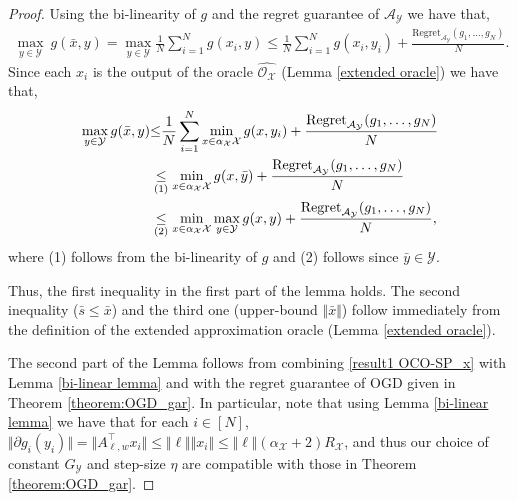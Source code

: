 \documentclass[a4paper,12pt]{article}
\newcommand{\mY}{\mathcal{Y}}
\newcommand{\mX}{\mathcal{X}}
\newcommand{\oraclex}{\mathcal{O}_{\mX}}
\begin{document}
\begin{proof}
Using the bi-linearity of $g$ and the regret guarantee of $\mathcal{A}_\mY$ we have that,
\begin{align*}
\max_{y \in \mY}\ g(\bar{x},y) = \max_{y \in \mY}\frac{1}{N}\sum_{i=1}^N g(x_i,y) \leq \frac{1}{N}\sum_{i=1}^N g(x_i,y_i) +\frac{\text{Regret}_{\mathcal{A}_\mY}(g_1,\dots,g_N)}{N}.
\end{align*}
Since each $x_i$ is the output of the oracle $\widehat{\oraclex}$ (Lemma \ref{extended oracle}) we have that,
\begin{align} \label{result1 OCO-SP_x}
\max_{y \in \mY} g(\bar{x},y) &{\leq} \frac{1}{N}\sum_{i=1}^N\min_{x\in \alpha_{\mX} \mX} g(x,y_i)+\frac{\text{Regret}_{\mathcal{A}_\mY}(g_1,\dots,g_N)}{N} \notag \\
&\underset{(1)}{\leq}  \min_{x\in \alpha_{\mX} \mX} g(x,\bar{y})+\frac{\text{Regret}_{\mathcal{A}_\mY}(g_1,\dots,g_N)}{N} \notag \\
&\underset{(2)}{\leq}  \min_{x\in \alpha_{\mX} \mX} \max_{y\in \mY} g(x,y)+\frac{\text{Regret}_{\mathcal{A}_\mY}(g_1,\dots,g_N)}{N} ,
\end{align}
where (1) follows from the bi-linearity of $g$ and (2) follows since $\bar{y}\in\mY$.

Thus, the first inequality in the first part of the lemma holds. The second inequality ($\bar{s} \leq \bar{x}$) and the third one (upper-bound $\Vert{\bar{x}}\Vert$)  follow immediately from the definition of the extended approximation oracle  (Lemma \ref{extended oracle}).

The second part of the Lemma follows from combining \eqref{result1 OCO-SP_x} with Lemma \ref{bi-linear lemma} and with the regret guarantee of OGD given in Theorem \ref{theorem:OGD_gar}. In particular, note that using  Lemma \ref{bi-linear lemma} we have that for each $i\in[N]$, $\Vert{\partial{}g_i(y_i)}\Vert = \Vert{A_{\ell,w}^{\top}x_i}\Vert \leq \Vert{\ell}\Vert\Vert{x_i}\Vert \leq \Vert{\ell}\Vert(\alpha_{\mX}+2)R_{\mX}$, and thus our choice of constant $G_{\mY}$ and step-size $\eta$ are compatible with those in Theorem \ref{theorem:OGD_gar}.
\end{proof}
\end{document}
